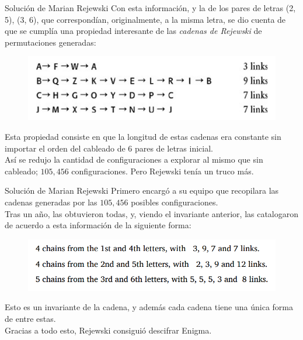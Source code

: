 \documentclass[aspectratio=169]{beamer}
\begin{document}
\begin{frame}{Solución de Marian Rejewski}
Con esta información, y la de los pares de letras (2, 5), (3, 6), que correspondían, originalmente, a la misma letra, se dio cuenta de que se cumplía una propiedad interesante de las \textit{cadenas de Rejewski} de permutaciones generadas:

\begin{figure}
    \centering
    \includegraphics[width=0.6\linewidth]{ordenacion3.png}
\end{figure}
Esta propiedad consiste en que la longitud de estas cadenas era constante sin importar el orden del cableado de 6 pares de letras inicial.\pause \\  
Así se redujo la cantidad de configuraciones a explorar al mismo que sin cableado; $105,456$ configuraciones. Pero Rejewski tenía un truco más.
\end{frame}

\begin{frame}{Solución de Marian Rejewski}
Primero encargó a su equipo que recopilara las cadenas generadas por las $105,456$ posibles configuraciones.\pause \\  
Tras un año, las obtuvieron todas, y, viendo el invariante anterior, las catalogaron de acuerdo a esta información de la siguiente forma:
\begin{figure}
    \centering
    \includegraphics[width=0.5\linewidth]{pic/ordenacion4.png}
\end{figure}
Esto es un invariante de la cadena, y además cada cadena tiene una única forma de entre estas.\pause \\  
Gracias a todo esto, Rejewski consiguió descifrar Enigma.

\end{frame}
\end{document}
